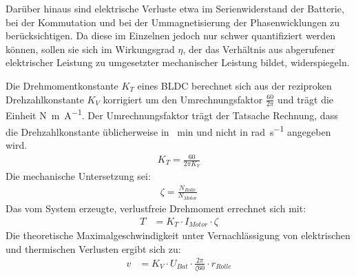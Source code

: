 	Darüber hinaus sind elektrische Verluste etwa im Serienwiderstand der Batterie, bei der Kommutation und bei der Ummagnetisierung der Phasenwicklungen zu berücksichtigen.
	Da diese im Einzelnen jedoch nur schwer quantifiziert werden können, sollen sie sich im Wirkungsgrad \(\eta\), der das Verhältnis aus abgerufener elektrischer Leistung zu umgesetzter mechanischer Leistung bildet, widerspiegeln.\par\medskip
	Die Drehmomentkonstante \(K_T\) eines BLDC berechnet sich aus der reziproken Drehzahlkonstante \(K_V\) korrigiert um den Umrechnungsfaktor \(\frac{60}{2\pi}\) und trägt die Einheit \unit{\newton\metre\per\ampere}.
	Der Umrechnungsfaktor trägt der Tatsache Rechnung, dass die Drehzahlkonstante üblicherweise in \unit{\per\minute} und nicht in \unit{\radian\per\second} angegeben wird.
	\begin{align}
		K_T = \frac{60}{2\pi K_V}
		\label{eq:kv to kt}
	\end{align}
	Die mechanische Untersetzung sei:
	\begin{align}
		\zeta = \frac{N_{Rolle}}{N_{Motor}}
		\label{eq:reduction}
	\end{align}
	Das vom System erzeugte, verlustfreie Drehmoment errechnet sich mit:
	\begin{align}
		T	&= K_T \cdot I_{Motor} \cdot \zeta
		\label{eq:frictionless acceleration}
	\end{align}
	Die theoretische Maximalgeschwindigkeit unter Vernachlässigung von elektrischen und thermischen Verlusten ergibt sich zu:
	\begin{align}
		v	&= K_V \cdot U_{Bat} \cdot \frac{2\pi}{\zeta 60} \cdot r_{Rolle}
		\label{eq:kv rating}
	\end{align}

